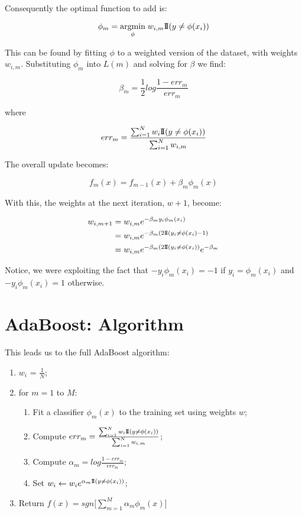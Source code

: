\documentclass[a4paper, 12pt]{article}
\begin{document}
Consequently the optimal function to add is:

  $$ \phi_m = \underset{\phi}{\mathrm{argmin}}\; w_{i,m} {\rm I\!I}(y \ne \phi(x_i)) $$

This can be found by fitting $\phi$ to a weighted version of the dataset, with weights $w_{i,m}$. Substituting $\phi_m$ into $L(m)$ and solving for $\beta$ we find:

  $$ \beta_m = \frac12 log \frac{1-err_m}{err_m} $$

where

  $$ err_m = \frac{\sum_{i=1}^N w_i {\rm I\!I}(y \ne \phi(x_i))}{\sum_{i=1}^N w_{i,m}} $$

The overall update becomes:

  $$ f_m(x) = f_{m-1}(x) + \beta_m \phi_m(x) $$

\vspace{1em}
With this, the weights at the next iteration, $w+1$, become:

\begin{align*}
  w_{i,m+1} &= w_{i,m} e^{-\beta_m y_i \phi_m(x_i)} \\
            &= w_{i,m} e^{-\beta_m (2{\rm I\!I}(y_i \ne \phi(x_i)-1)} \\
            &= w_{i,m} e^{-\beta_m (2{\rm I\!I}(y_i \ne \phi(x_i))} e^{-\beta_m}
\end{align*}

Notice, we were exploiting the fact that $-y_i\phi_m(x_i) = -1$ if $y_i = \phi_m(x_i)$ and $-y_i\phi_m(x_i) = 1$ otherwise.

\newpage
\section*{AdaBoost: Algorithm}
This leads us to the full AdaBoost algorithm:

\begin{enumerate}
  \item $w_i$ = $\frac1N$;
  \item for $m=1$ to $M$:
    \begin{enumerate}
      \item Fit a classifier $\phi_m(x)$ to the training set using weights $w$;
      \item Compute $err_m = \frac{\sum_{i=1}^N w_i {\rm I\!I}(y \ne \phi(x_i))}{\sum_{i=1}^N w_{i,m}}$;
      \item Compute $\alpha_m = log \frac{1-err_m}{err_m}$;
      \item Set $w_i \leftarrow w_i e^{\alpha_m {\rm I\!I}(y \ne \phi(x_i))}$;
    \end{enumerate}
  \item Return $f(x) = sgn \big[\sum_{m=1}^M \alpha_m \phi_m(x) \big]$
\end{enumerate}
\end{document}
